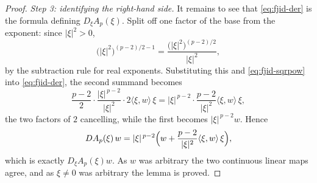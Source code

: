 \begin{proof}
\medskip\noindent\emph{Step 3: identifying the right-hand side.}
It remains to see that \eqref{eq:fjid-der} is the formula defining $D_\xi A_p(\xi)$.  Split off
one factor of the base from the exponent: since $\lvert\xi\rvert^{2}>0$,
\[
  \bigl(\lvert\xi\rvert^{2}\bigr)^{(p-2)/2-1}
  =\frac{\bigl(\lvert\xi\rvert^{2}\bigr)^{(p-2)/2}}{\lvert\xi\rvert^{2}} ,
\]
by the subtraction rule for real exponents.  Substituting this and
\eqref{eq:fjid-sqrpow} into \eqref{eq:fjid-der}, the second summand becomes
\[
  \frac{p-2}{2}\cdot\frac{\lvert\xi\rvert^{\,p-2}}{\lvert\xi\rvert^{2}}\cdot
    2\langle\xi,w\rangle\,\xi
  =\lvert\xi\rvert^{\,p-2}\cdot
    \frac{p-2}{\lvert\xi\rvert^{2}}\langle\xi,w\rangle\,\xi ,
\]
the two factors of $2$ cancelling, while the first becomes $\lvert\xi\rvert^{\,p-2}w$.  Hence
\[
  DA_p(\xi)\,w
  =\lvert\xi\rvert^{\,p-2}\Bigl(w+\frac{p-2}{\lvert\xi\rvert^{2}}\langle\xi,w\rangle\,\xi\Bigr),
\]
which is exactly $D_\xi A_p(\xi)w$.  As $w$ was arbitrary the two continuous linear maps agree,
and as $\xi\ne0$ was arbitrary the lemma is proved.
\end{proof}
